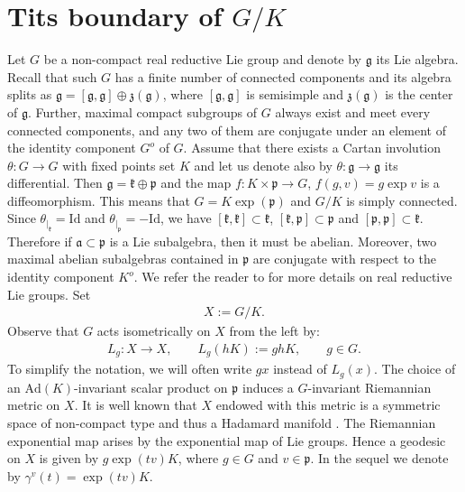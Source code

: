 \documentclass[leqno,11pt, a4]{amsart}
\theoremstyle{named}
\begin{document}
\section{Tits boundary of $G/K$}\label{titssection}
Let $G$ be a non-compact real reductive Lie group and denote by ${\mathfrak{g}}$ its Lie algebra. Recall that such $G$ has a finite number of connected components and its algebra splits as ${\mathfrak{g}}=[{\mathfrak{g}} ,{\mathfrak{g}}]\oplus \mathfrak z ({\mathfrak{g}})$, where $[{\mathfrak{g}} ,{\mathfrak{g}}]$ is semisimple and $\mathfrak z ({\mathfrak{g}})$ is the center of ${\mathfrak{g}}$.
Further, maximal compact subgroups of $G$ always exist and meet every connected components, and any two of them are conjugate under an element of the identity component $G^o$ of $G$.
 Assume that there exists a Cartan involution $\theta:G {\longrightarrow} G$ with fixed points set $K$ and let us denote also by $\theta:{\mathfrak{g}} {\longrightarrow} {\mathfrak{g}}$ its differential. Then ${\mathfrak{g}}={\mathfrak{k}}\oplus {\mathfrak{p}}$ and the map $f: K \times {\mathfrak{p}} {\rightarrow} G$, $f(g, {{v}} ) = g  \exp {{v}} $ is a
diffeomorphism. This means that $G=K\exp({\mathfrak{p}})$ and $G/K$ is simply connected. Since $\theta_{|_{\mathfrak{k}}}=\mathrm{Id}$ and $\theta_{|_{\mathfrak{p}}}=-\mathrm{Id}$, we have
$[{\mathfrak{k}},{\mathfrak{k}}]\subset {\mathfrak{k}}$, $[{\mathfrak{k}},{\mathfrak{p}}]\subset {\mathfrak{p}}$ and $[{\mathfrak{p}},{\mathfrak{p}}]\subset {\mathfrak{k}}$. Therefore if ${\mathfrak{a}} \subset {\mathfrak{p}}$ is a Lie subalgebra, then it must be abelian. Moreover, two maximal abelian subalgebras contained in ${\mathfrak{p}}$ are conjugate with respect to the identity component $K^o$. We refer the reader to \cite{borel-ji-libro,helgason, knapp-beyond} for more details on real reductive Lie groups.
Set
 \begin{gather*}
    X:=G/K.
  \end{gather*}
  Observe that $G$ acts isometrically on $X$ from the left by:
  \begin{gather*}
    L_g : X {\rightarrow} X , \qquad L_g(hK) :=ghK,\qquad g\in G.
  \end{gather*}
To simplify the notation, we will often write $gx$ instead of $L_g(x)$.
The choice of an $\mathrm{Ad}(K)$-invariant scalar product on ${\mathfrak{p}}$ induces a $G$-invariant Riemannian metric on $X$. It is well known that $X$ endowed with this metric is a symmetric space of non-compact type and thus a Hadamard manifold \cite{eberlein, helgason}. The Riemannian exponential map arises  by the exponential map of Lie groups. Hence a geodesic on $X$ is given by $g \exp (tv)K$, where  $g\in G$ and $v\in {\mathfrak{p}}$. In the sequel we denote by $\gamma^v (t)=\exp(tv) K$.
\end{document}
